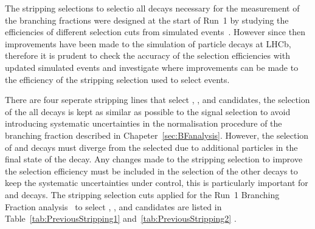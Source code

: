 The stripping selections to selectio all decays necessary for the measurement of the \bmumu branching fractions were designed at the start of Run~1 by studying the efficiencies of different selection cuts from simulated events~\cite{Diego}. However since then improvements have been made to the simulation of particle decays at LHCb, therefore it is prudent to check the accuracy of the selection efficiencies with updated simulated events and investigate where improvements can be made to the efficiency of the stripping selection used to select \bmumu events.



There are four seperate stripping lines that select \bmumu, \bujpsik, \bsjpisphi and \bhh candidates, the selection of the all decays is kept as similar as possible to the signal selection to avoid introducing systematic uncertainties in the normalisation procedure of the branching fraction described in Chapeter~\ref{sec:BFanalysis}. However, the selection of \bujpsik and \bsjpsiphi decays must diverge from the \bmumu selected due to additional particles in the final state of the decay. Any changes made to the \bmumu stripping selection to improve the selection efficiency must be included in the selection of the other decays to keep the systematic uncertainties under control, this is particularly important for \bhh and \bujpsik decays. %
The stripping selection cuts applied for the Run~1 Branching Fraction analysis~\cite{CMS:2014xfa, Aaij:2013aka} to select \bmumu, \bujpsik, \bsjpisphi and \bhh candidates are listed in Table~\ref{tab:PreviousStripping1} and~\ref{tab:PreviousStripping2} .


